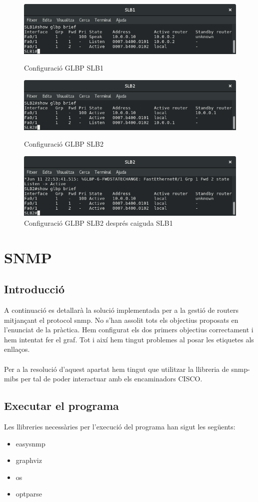 \documentclass[10pt]{article}
\begin{document}
\begin{figure}
	\includegraphics[scale=0.7]{Images/captura1.png}
	\caption{Configuració GLBP SLB1}
	\includegraphics[scale=0.7]{Images/Captura2.png}
	\caption{Configuració GLBP SLB2}
	\includegraphics[scale=0.7]{Images/captura3.png}
	\caption{Configuració GLBP SLB2 després caiguda SLB1}
\end{figure}
\newpage
\section{SNMP}
\subsection{Introducció}
A continuació es detallarà la solució implementada per a la gestió de routers mitjançant el protocol snmp. No s'han assolit tots els objectius proposats en l'enunciat de la pràctica. Hem configurat els dos primers objectius correctament i hem intentat fer el graf. Tot i així hem tingut problemes al posar les etiquetes als enllaços.
\\\\
Per a la resolució d'aquest apartat hem tingut que utilitzar la llibreria de snmp-mibs per tal de poder interactuar amb els encaminadors CISCO.
\subsection{Executar el programa}
Les llibreries necessàries per l'execució del programa han sigut les següents:
\begin{itemize}
	\item easysnmp
	\item graphviz
	\item os
	\item optparse
\end{itemize}
\end{document}
